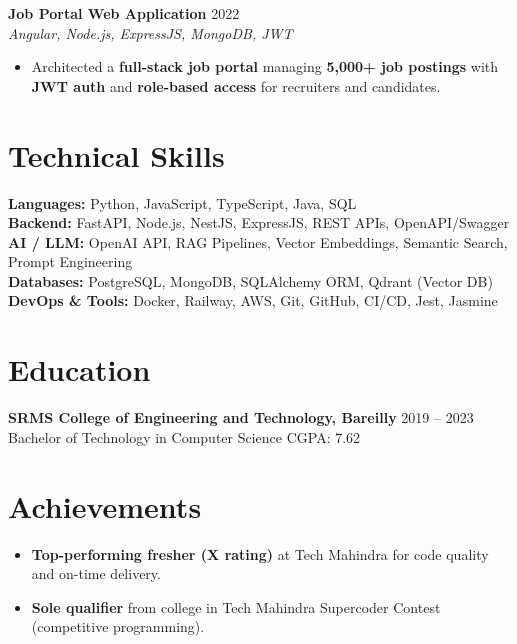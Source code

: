 \documentclass[letterpaper,11pt]{article}
\begin{document}
\textbf{Job Portal Web Application} \href{https://github.com/PawanYadavv/jobportal-frontend/tree/master/src/app}{\faGithub} \hfill 2022 \\
\emph{Angular, Node.js, ExpressJS, MongoDB, JWT}
\begin{itemize}
\item Architected a \textbf{full-stack job portal} managing \textbf{5,000+ job postings} with \textbf{JWT auth} and \textbf{role-based access} for recruiters and candidates.
\end{itemize}

\vspace{-15pt}

\section{Technical Skills}
\small{
\textbf{Languages:} Python, JavaScript, TypeScript, Java, SQL \\
\textbf{Backend:} FastAPI, Node.js, NestJS, ExpressJS, REST APIs, OpenAPI/Swagger \\
\textbf{AI / LLM:} OpenAI API, RAG Pipelines, Vector Embeddings, Semantic Search, Prompt Engineering \\
\textbf{Databases:} PostgreSQL, MongoDB, SQLAlchemy ORM, Qdrant (Vector DB) \\
\textbf{DevOps \& Tools:} Docker, Railway, AWS, Git, GitHub, CI/CD, Jest, Jasmine
}
\vspace{-12pt}

\section{Education}
\textbf{SRMS College of Engineering and Technology, Bareilly} \hfill 2019 -- 2023 \\
Bachelor of Technology in Computer Science \hfill CGPA: 7.62
\vspace{-13pt}

\section{Achievements}
\begin{itemize}
\item \textbf{Top-performing fresher (X rating)} at Tech Mahindra for code quality and on-time delivery.
\item \textbf{Sole qualifier} from college in Tech Mahindra Supercoder Contest (competitive programming).
\end{itemize}
\end{document}
